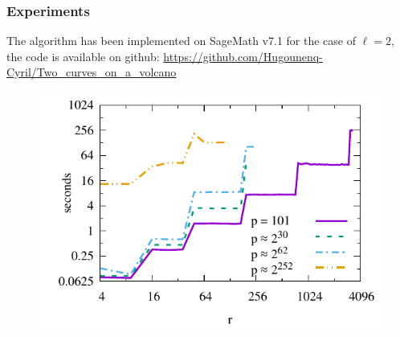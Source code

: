 \documentclass[10pt,a4paper]{beamer}
\theoremstyle{plain}
\theoremstyle{definition}
\theoremstyle{definition}
\theoremstyle{definition}
\theoremstyle{definition}
\theoremstyle{remark}
\theoremstyle{remark}
\begin{document}
%		
%		
%		
%


\begin{frame}
\frametitle{Experiments}
The algorithm has been implemented on SageMath v7.1 for the case of $\ell=2$, the code is available on github: \url{https://github.com/Hugounenq-Cyril/Two_curves_on_a_volcano}
\begin{figure}[hbtp]
\centering
\includegraphics[scale=0.8]{Images/graphe-101-149-269.pdf}
\end{figure}
\end{frame}

\end{document}

